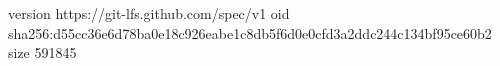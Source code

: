 version https://git-lfs.github.com/spec/v1
oid sha256:d55cc36e6d78ba0e18c926eabe1c8db5f6d0e0cfd3a2ddc244c134bf95ce60b2
size 591845
